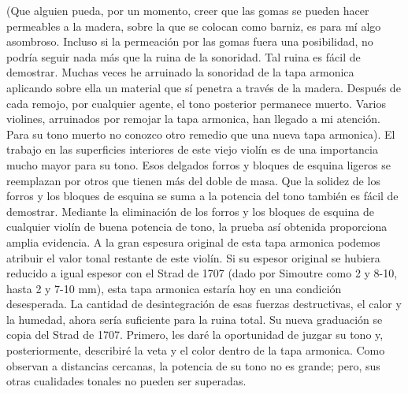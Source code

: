\documentclass[12pt]{book}
\begin{document}
(Que alguien pueda, por un momento, creer que las gomas se pueden hacer permeables a la madera, sobre la que se colocan como barniz, es para mí algo asombroso. Incluso si la permeación por las gomas fuera una posibilidad, no podría seguir nada más que la ruina de la sonoridad. Tal ruina es fácil de demostrar. Muchas veces he arruinado la sonoridad de la tapa armonica aplicando sobre ella un material que sí penetra a través de la madera. Después de cada remojo, por cualquier agente, el tono posterior permanece muerto. Varios violines, arruinados por remojar la tapa armonica, han llegado a mi atención. Para su tono muerto no conozco otro remedio que una nueva tapa armonica). El trabajo en las superficies interiores de este viejo violín es de una importancia mucho mayor para su tono. Esos delgados forros y bloques de esquina ligeros se reemplazan por otros que tienen más del doble de masa. Que la solidez de los forros y los bloques de esquina se suma a la potencia del tono también es fácil de demostrar. Mediante la eliminación de los forros y los bloques de esquina de cualquier violín de buena potencia de tono, la prueba así obtenida proporciona amplia evidencia. A la gran espesura original de esta tapa armonica podemos atribuir el valor tonal restante de este violín. Si su espesor original se hubiera reducido a igual espesor con el Strad de 1707 (dado por Simoutre como 2 y 8-10, hasta 2 y 7-10 mm), esta tapa armonica estaría hoy en una condición desesperada. La cantidad de desintegración de esas fuerzas destructivas, el calor y la humedad, ahora sería suficiente para la ruina total. Su nueva graduación se copia del Strad de 1707. Primero, les daré la oportunidad de juzgar su tono y, posteriormente, describiré la veta y el color dentro de la tapa armonica. Como observan a distancias cercanas, la potencia de su tono no es grande; pero, sus otras cualidades tonales no pueden ser superadas.
\end{document}
